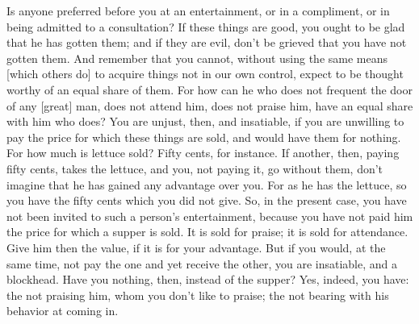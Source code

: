Is anyone preferred before you at an entertainment, or in a compliment,
or in being admitted to a consultation? If these things are good,
you ought to be glad that he has gotten them; and if they are evil,
don't be grieved that you have not gotten them. And remember that
you cannot, without using the same means [which others do] to acquire
things not in our own control, expect to be thought worthy of an equal
share of them. For how can he who does not frequent the door of any
[great] man, does not attend him, does not praise him, have an equal
share with him who does? You are unjust, then, and insatiable, if
you are unwilling to pay the price for which these things are sold,
and would have them for nothing. For how much is lettuce sold? Fifty
cents, for instance. If another, then, paying fifty cents, takes the
lettuce, and you, not paying it, go without them, don't imagine that
he has gained any advantage over you. For as he has the lettuce, so
you have the fifty cents which you did not give. So, in the present
case, you have not been invited to such a person's entertainment,
because you have not paid him the price for which a supper is sold.
It is sold for praise; it is sold for attendance. Give him then the
value, if it is for your advantage. But if you would, at the same
time, not pay the one and yet receive the other, you are insatiable,
and a blockhead. Have you nothing, then, instead of the supper? Yes,
indeed, you have: the not praising him, whom you don't like to praise;
the not bearing with his behavior at coming in. 
